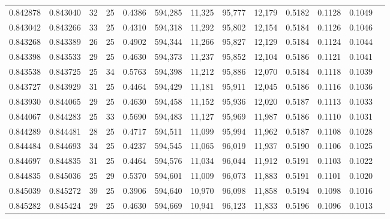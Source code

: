 \begin{tabular}{rrrrrrrrrrrrr}
0.842878 & 0.843040 &    32 &  25 &                                     0.4386 & 594,285 &  11,325 &  95,777 &  12,179 & 0.5182 & 0.1128 & 0.1049 \\
0.843042 & 0.843266 &    33 &  25 &                                     0.4310 & 594,318 &  11,292 &  95,802 &  12,154 & 0.5184 & 0.1126 & 0.1046 \\
0.843268 & 0.843389 &    26 &  25 &                                     0.4902 & 594,344 &  11,266 &  95,827 &  12,129 & 0.5184 & 0.1124 & 0.1044 \\
0.843398 & 0.843533 &    29 &  25 &                                     0.4630 & 594,373 &  11,237 &  95,852 &  12,104 & 0.5186 & 0.1121 & 0.1041 \\
0.843538 & 0.843725 &    25 &  34 &                                     0.5763 & 594,398 &  11,212 &  95,886 &  12,070 & 0.5184 & 0.1118 & 0.1039 \\
0.843727 & 0.843929 &    31 &  25 &                                     0.4464 & 594,429 &  11,181 &  95,911 &  12,045 & 0.5186 & 0.1116 & 0.1036 \\
0.843930 & 0.844065 &    29 &  25 &                                     0.4630 & 594,458 &  11,152 &  95,936 &  12,020 & 0.5187 & 0.1113 & 0.1033 \\
0.844067 & 0.844283 &    25 &  33 &                                     0.5690 & 594,483 &  11,127 &  95,969 &  11,987 & 0.5186 & 0.1110 & 0.1031 \\
0.844289 & 0.844481 &    28 &  25 &                                     0.4717 & 594,511 &  11,099 &  95,994 &  11,962 & 0.5187 & 0.1108 & 0.1028 \\
0.844484 & 0.844693 &    34 &  25 &                                     0.4237 & 594,545 &  11,065 &  96,019 &  11,937 & 0.5190 & 0.1106 & 0.1025 \\
0.844697 & 0.844835 &    31 &  25 &                                     0.4464 & 594,576 &  11,034 &  96,044 &  11,912 & 0.5191 & 0.1103 & 0.1022 \\
0.844835 & 0.845036 &    25 &  29 &                                     0.5370 & 594,601 &  11,009 &  96,073 &  11,883 & 0.5191 & 0.1101 & 0.1020 \\
0.845039 & 0.845272 &    39 &  25 &                                     0.3906 & 594,640 &  10,970 &  96,098 &  11,858 & 0.5194 & 0.1098 & 0.1016 \\
0.845282 & 0.845424 &    29 &  25 &                                     0.4630 & 594,669 &  10,941 &  96,123 &  11,833 & 0.5196 & 0.1096 & 0.1013 \\

\end{tabular}
